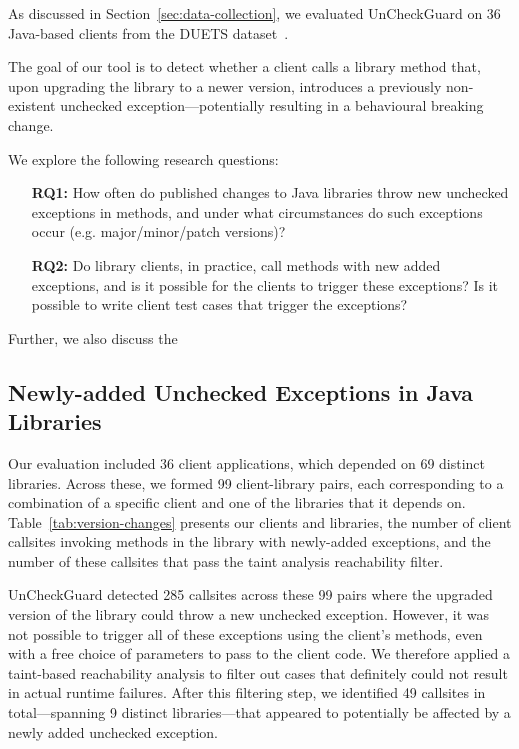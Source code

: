 As discussed in Section~\ref{sec:data-collection}, we evaluated UnCheckGuard on 36 Java-based clients from the DUETS dataset~\cite{durieux21:_duets}.

The goal of our tool is to detect whether a client calls a library method that, upon upgrading the library to a newer version, introduces a previously non-existent unchecked exception—potentially resulting in a behavioural breaking change.

We explore the following research questions:

\begin{itemize}
  \item[\textbf{RQ1:}] How often do published changes to Java libraries throw new unchecked exceptions in methods,
and under what circumstances do such exceptions occur (e.g. major/minor/patch versions)?
  \item[\textbf{RQ2:}]  Do library clients, in practice, call methods with new added exceptions, and is it possible for the clients to trigger these exceptions? Is it possible to write client test cases that trigger the exceptions?
\end{itemize}


Further, we also discuss the 

\subsection{Newly-added Unchecked Exceptions in Java Libraries}

Our evaluation included 36 client applications, which depended on 69 distinct libraries. Across these, we formed 99 client-library pairs, each corresponding to a combination of a specific client and one of the libraries that it depends on. Table~\ref{tab:version-changes} presents our clients and libraries, the number of client callsites invoking methods in the library with newly-added exceptions, and the number of these callsites that pass the taint analysis reachability filter.

UnCheckGuard detected 285 callsites across these 99 pairs where the upgraded version of the library could throw a new unchecked exception. However, it was not possible to trigger all of these exceptions using the client's methods, even with a free choice of parameters to pass to the client code. We therefore applied a taint-based reachability analysis to filter out cases that definitely could not result in actual runtime failures. After this filtering step, we identified 49 callsites in total—spanning 9 distinct libraries—that appeared to potentially be affected by a newly added unchecked exception.

